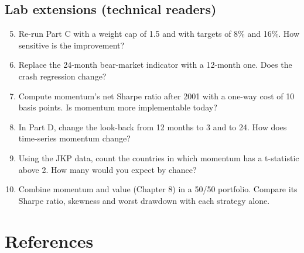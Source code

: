 \subsection*{Lab extensions (technical readers)}

\begin{enumerate}
  \setcounter{enumi}{4}
  \item Re-run Part C with a weight cap of 1.5 and with targets of 8\% and 16\%. How sensitive is the improvement?
  \item Replace the 24-month bear-market indicator with a 12-month one. Does the crash regression change?
  \item Compute momentum's net Sharpe ratio after 2001 with a one-way cost of 10 basis points. Is momentum more implementable today?
  \item In Part D, change the look-back from 12 months to 3 and to 24. How does time-series momentum change?
  \item Using the JKP data, count the countries in which momentum has a t-statistic above 2. How many would you expect by chance?
  \item Combine momentum and value (Chapter 8) in a 50/50 portfolio. Compare its Sharpe ratio, skewness and worst drawdown with each strategy alone.
\end{enumerate}

\section*{References}

